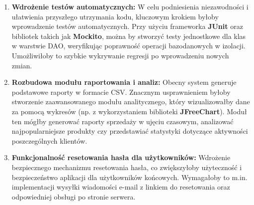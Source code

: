 \begin{enumerate}
    \item \textbf{Wdrożenie testów automatycznych:} W celu podniesienia niezawodności i ułatwienia przyszłego utrzymania kodu, kluczowym krokiem byłoby wprowadzenie testów automatycznych. Przy użyciu frameworka \textbf{JUnit} oraz bibliotek takich jak \textbf{Mockito}, można by stworzyć testy jednostkowe dla klas w warstwie DAO, weryfikując poprawność operacji bazodanowych w izolacji. Umożliwiłoby to szybkie wykrywanie regresji po wprowadzeniu nowych zmian.

    \item \textbf{Rozbudowa modułu raportowania i analiz:} Obecny system generuje podstawowe raporty w formacie CSV. Znacznym usprawnieniem byłoby stworzenie zaawansowanego modułu analitycznego, który wizualizowałby dane za pomocą wykresów (np. z wykorzystaniem biblioteki \textbf{JFreeChart}). Moduł ten mógłby generować raporty sprzedaży w ujęciu czasowym, analizować najpopularniejsze produkty czy przedstawiać statystyki dotyczące aktywności poszczególnych klientów.

    \item \textbf{Funkcjonalność resetowania hasła dla użytkowników:} Wdrożenie bezpiecznego mechanizmu resetowania hasła, co zwiększyłoby użyteczność i bezpieczeństwo aplikacji dla użytkowników końcowych. Wymagałoby to m.in. implementacji wysyłki wiadomości e-mail z linkiem do resetowania oraz odpowiedniej obsługi po stronie serwera.
\end{enumerate}